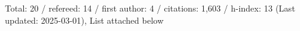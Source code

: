 Total: 20 / refereed: 14 / first author: 4 / citations: 1,603 / h-index: 13 (Last updated: 2025-03-01), List attached below